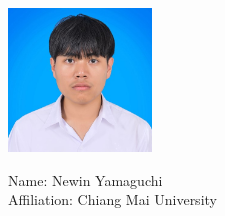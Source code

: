\documentclass[final,isne,project]{cpecmu}
\author{นายเนวิน ยามากุชิ}{Newin Yamaguchi}{630615028}
\author{นางสาวพัชราภรณ์ สท้านไตรภพ}{Patcharaporn Satantaipop}{630615035}
\begin{document}


\pagestyle{empty}\cleardoublepage
\normalspacing \setcounter{page}{1}  \pagestyle{cpecmu}





\ifproject


\fi

\ifproject

\normalspacing
\appendix


\ifglossary\glossarypage\fi

\ifindex\indexpage\fi

\begin{biosketch}
\begin{figure}[H]
\center
  \begin{minipage}{0.45\textwidth}
    \begin{center}
      \includegraphics[width=1.5in]{./img/newin_picture.jpg}
    \end{center}
    \begin{center}
      \textsf{Name: Newin Yamaguchi} \\
      \textsf{Affiliation: Chiang Mai University} \\
    \end{center}
  \end{minipage}
\end{figure}



\end{biosketch}
\end{document}
